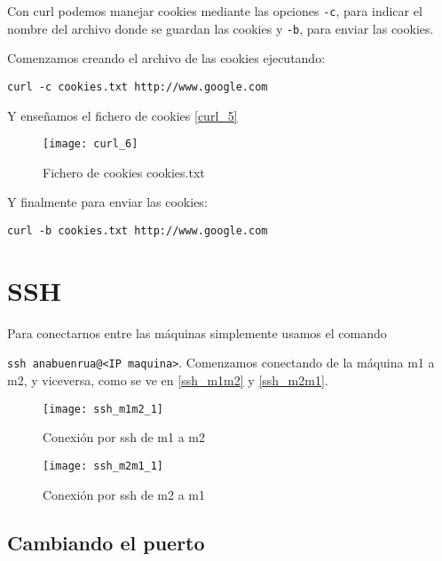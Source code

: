 Con curl podemos manejar cookies mediante las opciones \verb|-c|, para indicar el nombre del archivo donde se guardan las cookies y \verb|-b|, para enviar las cookies.

Comenzamos creando el archivo de las cookies ejecutando:

\begin{verbatim}
curl -c cookies.txt http://www.google.com
\end{verbatim}

Y enseñamos el fichero de cookies \eqref{curl_5}

\begin{figure}[h!]
\begin{center}
\caption{Fichero de cookies cookies.txt}
\label{curl_5}
\texttt{[image: curl\_6]}
\end{center}
\end{figure}

Y finalmente para enviar las cookies:

\begin{verbatim}
curl -b cookies.txt http://www.google.com
\end{verbatim}

\chapter{SSH}

Para conectarnos entre las máquinas simplemente usamos el comando 

\verb|ssh anabuenrua@<IP maquina>|. Comenzamos conectando de la máquina m1 a m2, y viceversa, como se ve en \eqref{ssh_m1m2} y \eqref{ssh_m2m1}.


\begin{figure}[h!]
\begin{center}
\caption{Conexión por ssh de m1 a m2}
\label{ssh_m1m2}
\texttt{[image: ssh\_m1m2\_1]}
\end{center}
\end{figure}


\begin{figure}[h!]
\begin{center}
\caption{Conexión por ssh de m2 a m1}
\label{ssh_m2m1}
\texttt{[image: ssh\_m2m1\_1]}
\end{center}
\end{figure}

\section{Cambiando el puerto}

